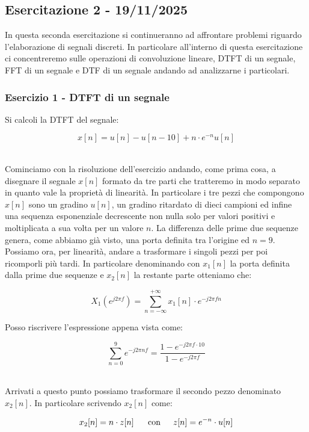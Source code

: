 \documentclass[../main.tex]{subfiles}
\begin{document}
\clearpage
\thispagestyle{empty}
\vspace*{7cm}
\subsection{Esercitazione 2 - 19/11/2025}
\vspace*{1.5cm}

In questa seconda esercitazione si continueranno ad affrontare problemi riguardo l'elaborazione di segnali discreti. In particolare all'interno di questa esercitazione ci concentreremo sulle operazioni di convoluzione lineare, DTFT di un segnale, FFT di un segnale e DTF di un segnale andando ad analizzarne i particolari.

\subsubsection{Esercizio 1 - DTFT di un segnale}

Si calcoli la DTFT del segnale:

\[ x[n] = u[n] - u[n-10] + n \cdot e^{-n}u[n] \]\

Cominciamo con la risoluzione dell'esercizio andando, come prima cosa, a disegnare il segnale $x[n]$ formato da tre parti che tratteremo in modo separato in quanto vale la proprietà di linearità. 
In particolare i tre pezzi che compongono $x[n]$ sono un gradino $u[n]$, un gradino ritardato di dieci campioni ed infine una sequenza esponenziale decrescente non nulla solo per valori positivi e moltiplicata a sua volta per un valore $n$.
La differenza delle prime due sequenze genera, come abbiamo già visto, una porta definita tra l'origine ed $n = 9$.\\

Possiamo ora, per linearità, andare a trasformare i singoli pezzi per poi ricomporli più tardi.
In particolare denominando con $x_1[n]$ la porta definita dalla prime due sequenze e $x_2[n]$ la restante parte otteniamo che:

\[ X_1(e^{j2 \pi f}) = \sum_{n = -\infty}^{+\infty} x_1[n] \cdot e ^{-j2 \pi f n}  \]

Posso riscrivere l'espressione appena vista come:

\[ \sum_{n = 0}^9 e^{-j2\pi n f} = \frac{1 - e^{-j2\pi f \cdot 10}}{1 - e^{-j2\pi f}}\]\

Arrivati a questo punto possiamo trasformare il secondo pezzo denominato $x_2[n]$.
In particolare scrivendo $x_2[n]$ come:

\[ x_2[n] = n \cdot z[n] \hspace{15 pt} \, \mathrm{con} \hspace{15 pt} z[n] = e^{-n} \cdot u[n]  \]
\end{document}
